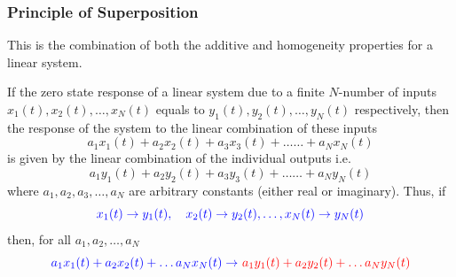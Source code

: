 \documentclass[
  12pt,
  a4paper,
]{report}
\begin{document}
\subsubsection{Principle of
Superposition}\label{principle-of-superposition}

This is the combination of both the additive and homogeneity properties
for a linear system.

\begin{tcolorbox}[colback=boxbodycol,colframe=boxheadcol,title=\textcolor{red}{\textbf{Principle of Superposition}}]
    If the zero state response of a linear system due to a finite \(N\text{-number}\) of inputs \(x_1(t), x_2(t), \dots, x_N(t)\) equals to \(y_1(t), y_2(t), \dots, y_N(t)\) respectively, then the response of the system to the linear combination of these inputs
    \begin{equation}
        \label{eq:linear-superposition-input-equation}
        a_1x_1(t) + a_2x_2(t) + a_3x_3(t) + \dots\dots + a_Nx_N(t)
    \end{equation}
    is given by the linear combination of the individual outputs i.e.
    \begin{equation}
        \label{eq:linear-superposition-output-equation}
        a_1y_1(t) + a_2y_2(t) + a_3y_3(t) + \dots\dots + a_Ny_N(t)
    \end{equation}
    where \(a_1, a_2, a_3, \dots, a_N\) are arbitrary constants (either real or imaginary).   
    Thus, if 
    \begin{equation}
        \label{eq:linear-superposition-equation-noconstants}
        \textcolor{blue}{x_1(t) \rightarrow y_1(t), \quad x_2(t) \rightarrow y_2(t), \dots, x_N(t) \rightarrow y_N(t)}
    \end{equation}
    then, for all \(a_1, a_2, \dots, a_N\)
    \begin{equation}
        \label{eq:linear-superposition-equation-constants}
        \textcolor{blue}{a_1x_1(t) + a_2x_2(t) + \ldots  a_Nx_N(t)\rightarrow}\ \textcolor{red}{ a_1y_1(t) + a_2y_2(t) + \ldots  a_Ny_N(t)}
    \end{equation}
    \begin{tcolorbox}[colback=boxbodycol,colframe=boxheadcol]
        \begin{figure}[H]
            \begin{center}
                \label{fig:superposition-principle-diagram-tikz}
\end{center}
\end{figure}
\end{tcolorbox}
\end{tcolorbox}
\end{document}
